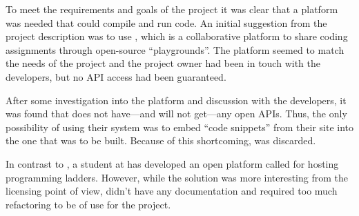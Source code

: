 To meet the requirements and goals of the project it was clear that a platform was needed that could compile and run code. An initial suggestion from the project description was to use \techio{}, which is a collaborative platform to share coding assignments through open-source ``playgrounds''. The platform seemed to match the needs of the project and the project owner had been in touch with the developers, but no API access had been guaranteed.

After some investigation into the platform and discussion with the developers, it was found that \techio{} does not have---and will not get---any open APIs. Thus, the only possibility of using their system was to  embed ``code snippets'' from their site into the one that was to be built. Because of this shortcoming, \techio{} was discarded.

In contrast to \techio{}, a student at \LTU{} has developed an open platform called \sockr{} for hosting programming ladders. However, while the solution was more interesting from the licensing point of view, \sockr{} didn't have any documentation and required too much refactoring to be of use for the project.
